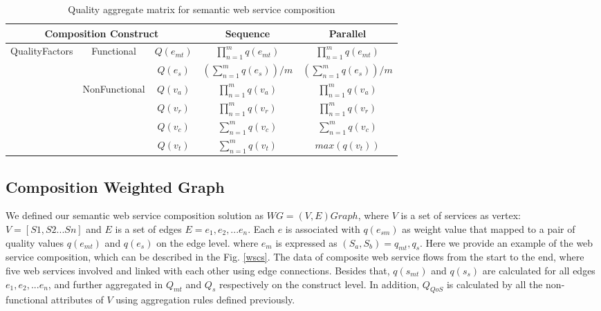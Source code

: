 \documentclass{llncs}
\begin{document}
\begin{table}[]
\centering
\caption{Quality aggregate matrix for semantic web service composition}
\label{table1}
\begin{tabular}{c|c|c|c|c}
\hline
\multicolumn{3}{c|}{Composition Construct}                                      & Sequence                             & Parallel \\ \hline
\multirow{5}{*}{QualityFactors} & \multirow{2}{*}{Functional}    & $Q(e_ {mt})$  &$\prod_{n=1}^{m} q(e_ {mt})$          &  $\prod_{n=1}^{m} q(e_ {mt})$ \\ \cline{3-5}
                                &                                & $Q(e_ {s})$  & $(\sum_{n=1}^m q(e_ {s}))/m$        &  $(\sum_{n=1}^m q(e_ {s}))/m$  \\ \cline{2-5}   
                                & \multirow{4}{*}{NonFunctional} & $Q(v_{a})$    & $\prod_{n=1}^{m} q(v_a)$             &  $\prod_{n=1}^{m} q(v_a)$ \\ \cline{3-5} 
                                &                                & $Q(v_{r})$    & $\prod_{n=1}^{m} q(v_r)$             &  $\prod_{n=1}^{m} q(v_r)$ \\ \cline{3-5} 
                                &                                & $Q(v_{c})$    & $\sum_{n=1}^m q(v_ {c})$             &  $\sum_{n=1}^m q(v_ {c})$ \\ \cline{3-5} 
                                &                                & $Q(v_{t})$    & $\sum_{n=1}^m q(v_ {t})$             &  $max(q(v_ {t}))$ \\ \hline
\end{tabular}
\end{table}



\subsection{Composition Weighted Graph}
We defined our semantic web service composition solution as $WG = (V, E)Graph$, where $V$ is a set of services as vertex: $V=[S1, S2...Sn]$ and $E$ is a set of edges $E = {e_{1}, e_{2},... e_{n}}$. Each $e$ is associated with $q(e_{sm})$ as weight value that mapped to a pair of quality values $q(e_{mt})$ and $q(e_{s})$ on the edge level. where $e_{m}$ is expressed as $(S_{a},S_{b})={q_{mt}, q_{s}}$. Here we provide an example of the web service composition, which can be described in the Fig. \ref{wscs}. The data of composite web service flows from the start to the end, where five web services involved and linked with each other using edge connections. Besides that, $q(s_{mt})$ and $q(s_{s})$ are calculated for all edges ${e_{1}, e_{2},... e_{n}}$, and further aggregated in $Q_{mt}$ and $Q_{s}$ respectively on the construct level. In addition, $Q_{QoS}$ is calculated by all the non-functional attributes of $V$ using aggregation rules defined previously.
\end{document}
